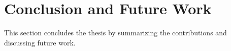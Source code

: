 \section{Conclusion and Future Work}

This section concludes the thesis by summarizing the contributions and discussing future work.







